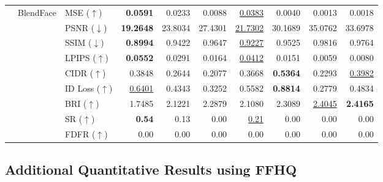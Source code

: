 \documentclass{article}
\begin{document}
\begin{table}[h!]
\begin{tabular}{lllrrrrrrr}
& \multirow{9}{*}{BlendFace}
& MSE ($\uparrow$) & \textbf{0.0591} & 0.0233 & 0.0088 & \underline{0.0383} & 0.0040 & 0.0013 & 0.0018 \\
& & PSNR ($\downarrow$) & \textbf{19.2648} & 23.8034 & 27.4301 & \underline{21.7302} & 30.1689 & 35.0762 & 33.6978 \\
& & SSIM ($\downarrow$) & \textbf{0.8994} & 0.9422 & 0.9647 & \underline{0.9227} & 0.9525 & 0.9816 & 0.9764 \\
& & LPIPS ($\uparrow$) & \textbf{0.0552} & 0.0291 & 0.0164 & \underline{0.0412} & 0.0151 & 0.0059 & 0.0080 \\
& & CIDR ($\uparrow$) & 0.3848 & 0.2644 & 0.2077 & 0.3668 & \textbf{0.5364} & 0.2293 & \underline{0.3982} \\
& & ID Loss ($\uparrow$) & \underline{0.6401} & 0.4343 & 0.3252 & 0.5582 & \textbf{0.8814} & 0.2779 & 0.4834 \\
& & BRI ($\uparrow$) & 1.7485 & 2.1221 & 2.2879 & 2.1080 & 2.3089 & \underline{2.4045} & \textbf{2.4165} \\
& & SR ($\uparrow$) & \textbf{0.54} & 0.13 & 0.00 & \underline{0.21} & 0.00 & 0.00 & 0.00 \\
& & FDFR ($\uparrow$) & 0.00 & 0.00 & 0.00 & 0.00 & 0.00 & 0.00 & 0.00 \\
\bottomrule
\end{tabular}
\end{table}

\clearpage

\subsection{Additional Quantitative Results using FFHQ}
\label{appendix:ffhq}
\end{document}
